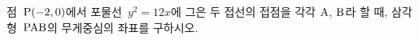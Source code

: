 점~$\mathrm{P}(-2{,}\mkern3mu\mathopen{}0)$에서 포물선~$y^2=12x$에 그은 두 접선의 접점을 각각 $\mathrm{A}$, $\mathrm{B}$라 할 때, 삼각형~$\mathrm{PAB}$의 무게중심의 좌표를 \mbox{구하시오.}
